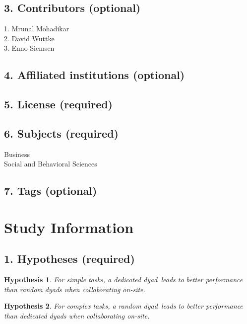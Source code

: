 \documentclass[A4,11pt]{article}
\renewcommand{\~}[1]{\tilde{#1}}
\renewcommand{\-}[1]{\overline{#1}}
\newtheorem{hypothesis}{Hypothesis}
\newcommand{\dyad}{dyad}
\begin{document}
\subsection*{3. Contributors (optional)}
1. Mrunal Mohadikar\\
2. David Wuttke\\
3. Enno Siemsen

\subsection*{4. Affiliated institutions (optional)}

\subsection*{5. License (required) }

\subsection*{6. Subjects (required) }
Business\\
Social and Behavioral Sciences

\subsection*{7. Tags (optional)}

\newpage

\section*{Study Information}

\subsection*{1. Hypotheses (required) }

\begin{hypothesis}\label{h:onsite_simple}
For simple tasks, a dedicated \dyad\ leads to better performance than random \dyad s when collaborating on-site.
\end{hypothesis}

\begin{hypothesis}\label{h:onsite_complex}
For complex tasks, a random \dyad\ leads to better performance than dedicated \dyad s when collaborating on-site.
\end{hypothesis}
\end{document}
